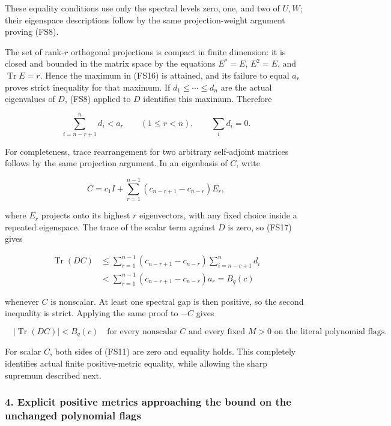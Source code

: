 These equality conditions use only the spectral levels zero, one, and two of \(U,W\); their eigenspace descriptions follow by the same projection-weight argument proving (FS8).

The set of rank-\(r\) orthogonal projections is compact in finite dimension: it is closed and bounded in the matrix space by the equations \(E^*=E\), \(E^2=E\), and \(\operatorname{Tr}E=r\). Hence the maximum in (FS16) is attained, and its failure to equal \(a_r\) proves strict inequality for that maximum. If \(d_1\le\cdots\le d_n\) are the actual eigenvalues of \(D\), (FS8) applied to \(D\) identifies this maximum. Therefore

\[
\sum_{i=n-r+1}^n d_i<a_r
\qquad(1\le r<n),\qquad \sum_i d_i=0.
\tag{FS17}
\]

For completeness, trace rearrangement for two arbitrary self-adjoint matrices follows by the same projection argument. In an eigenbasis of \(C\), write

\[
C=c_1I+\sum_{r=1}^{n-1}(c_{n-r+1}-c_{n-r})E_r,
\]

where \(E_r\) projects onto its highest \(r\) eigenvectors, with any fixed choice inside a repeated eigenspace. The trace of the scalar term against \(D\) is zero, so (FS17) gives

\[
\begin{aligned}
\operatorname{Tr}(DC)
&\le\sum_{r=1}^{n-1}(c_{n-r+1}-c_{n-r})
       \sum_{i=n-r+1}^n d_i\\
&<\sum_{r=1}^{n-1}(c_{n-r+1}-c_{n-r})a_r
=B_q(c)
\end{aligned}
\tag{FS18}
\]

whenever \(C\) is nonscalar. At least one spectral gap is then positive, so the second inequality is strict. Applying the same proof to \(-C\) gives

\[
\boxed{\quad |\operatorname{Tr}(DC)|<B_q(c)
\quad\text{for every nonscalar }C\text{ and every fixed }M>0
\text{ on the literal polynomial flags}.\quad}
\tag{FS19}
\]

For scalar \(C\), both sides of (FS11) are zero and equality holds. This completely identifies actual finite positive-metric equality, while allowing the sharp supremum described next.

\subsubsection{4. Explicit positive metrics approaching the bound on the unchanged polynomial flags}\label{endpoint-four_window_sharpness--explicit-positive-metrics-approaching-the-bound-on-the-unchanged-polynomial-flags}

